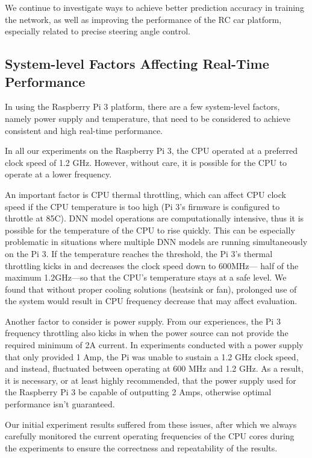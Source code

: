 We continue to investigate ways to achieve better prediction accuracy
in training the network, as well as improving the performance of the RC
car platform, especially related to precise steering angle control.

\subsection{System-level Factors Affecting Real-Time Performance}
In using the Raspberry Pi 3 platform, there are a
few system-level factors, namely power supply and temperature, that
need to be considered to achieve consistent and high real-time
performance. 

In all our experiments on the Raspberry Pi 3, the CPU  operated at a
preferred clock speed of 1.2 GHz. However, without care, it is
possible for the CPU to operate at a lower frequency. 

An important factor is CPU thermal throttling, which can affect CPU
clock speed if the CPU temperature is too high (Pi 3's firmware is
configured to throttle at 85C).
DNN model operations are computationally intensive, thus it is
possible for the temperature of the CPU to rise quickly. This can be
especially problematic in situations where multiple DNN models are
running simultaneously on the Pi 3.
If the temperature reaches the threshold, the Pi 3's thermal
throttling kicks in and decreases the clock speed down to 600MHz---
half of the maximum 1.2GHz---so that the CPU's temperature stays at a
safe level.
We found that without proper cooling solutions (heatsink or fan), 
prolonged use of the system would result in CPU frequency decrease
that may affect evaluation.

Another factor to consider is power supply. From our experiences, the
Pi 3 frequency throttling also kicks in when the power source can not
provide the required minimum of 2A current.
In experiments conducted with a power supply that only provided 1 Amp,
the Pi was unable to sustain a 1.2 GHz clock speed, and instead,
fluctuated between operating at 600 MHz and 1.2 GHz. As a result, it
is necessary, or at least highly recommended, that the power supply
used for the Raspberry Pi 3 be capable of outputting 2 Amps, otherwise
optimal performance isn't guaranteed.

Our initial experiment results suffered from these issues, after which
we always carefully monitored the current operating frequencies of the
CPU cores during the experiments to ensure the correctness and
repeatability of the results.

